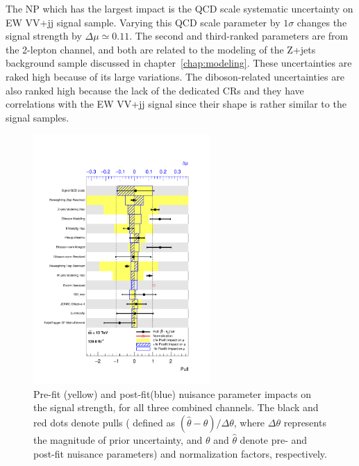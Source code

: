The NP which has the largest impact is the QCD scale systematic uncertainty on EW VV+jj signal sample. 
Varying this QCD scale parameter by $1\sigma$ changes the signal strength by $\Delta \mu \simeq 0.11$.
The second and third-ranked parameters are from the 2-lepton channel, and both are related to the modeling of the Z+jets background sample discussed in chapter~\ref{chap:modeling}. These uncertainties are raked high because of its large variations.
The diboson-related uncertainties are also ranked high because the lack of the dedicated CRs and they have correlations with the EW VV+jj signal since their shape is rather similar to the signal samples.
\begin{figure}[ht]
      \centering
        \includegraphics[width=0.60\textwidth]{figures/2lep/FitResults/pulls_mu_SemileptonicVBS_5.pdf}
        \caption{Pre-fit (yellow) and post-fit(blue) nuisance parameter impacts on the signal strength, for all three combined channels. The black and red dots denote pulls ( defined as $(\hat{\theta}-\theta) / \Delta \theta$, where $\Delta \theta$ represents the magnitude of prior uncertainty, and $\theta$ and $\hat{\theta}$ denote pre- and post-fit nuisance parameters) and normalization factors, respectively. %
        }
       \label{fig:fit_2lep_ranking_all}
\end{figure}
